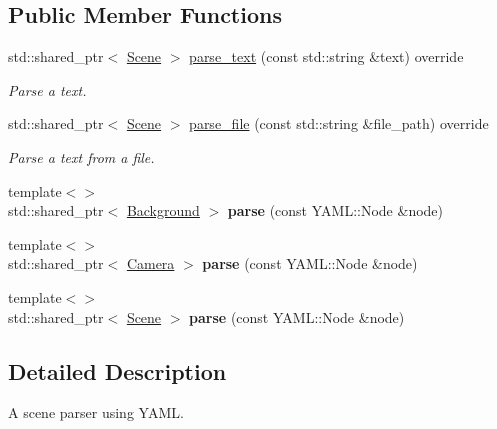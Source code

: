 \subsection*{Public Member Functions}
\begin{DoxyCompactItemize}
\item 
std\+::shared\+\_\+ptr$<$ \mbox{\hyperlink{classrayt_1_1_scene}{Scene}} $>$ \mbox{\hyperlink{classrayt_1_1_y_a_m_l_parser_a646b059fb458cbd5b9bc3a29c1f777f4}{parse\+\_\+text}} (const std\+::string \&text) override
\begin{DoxyCompactList}\small\item\em Parse a text. \end{DoxyCompactList}\item 
std\+::shared\+\_\+ptr$<$ \mbox{\hyperlink{classrayt_1_1_scene}{Scene}} $>$ \mbox{\hyperlink{classrayt_1_1_y_a_m_l_parser_ab569d1029cec7dc2cb91eb0e08f5bc37}{parse\+\_\+file}} (const std\+::string \&file\+\_\+path) override
\begin{DoxyCompactList}\small\item\em Parse a text from a file. \end{DoxyCompactList}\item 
\mbox{\label{classrayt_1_1_y_a_m_l_parser_a4941b74352196625b28329189603fea7}} 
{\footnotesize template$<$$>$ }\\std\+::shared\+\_\+ptr$<$ \mbox{\hyperlink{classrayt_1_1_background}{Background}} $>$ {\bfseries parse} (const Y\+A\+M\+L\+::\+Node \&node)
\item 
\mbox{\label{classrayt_1_1_y_a_m_l_parser_aa432a888b0dcb701c776300202e0adac}} 
{\footnotesize template$<$$>$ }\\std\+::shared\+\_\+ptr$<$ \mbox{\hyperlink{class_camera}{Camera}} $>$ {\bfseries parse} (const Y\+A\+M\+L\+::\+Node \&node)
\item 
\mbox{\label{classrayt_1_1_y_a_m_l_parser_a37aa462d299309063f9b6de402f8c3f2}} 
{\footnotesize template$<$$>$ }\\std\+::shared\+\_\+ptr$<$ \mbox{\hyperlink{classrayt_1_1_scene}{Scene}} $>$ {\bfseries parse} (const Y\+A\+M\+L\+::\+Node \&node)
\end{DoxyCompactItemize}


\subsection{Detailed Description}
A scene parser using Y\+A\+ML. 


